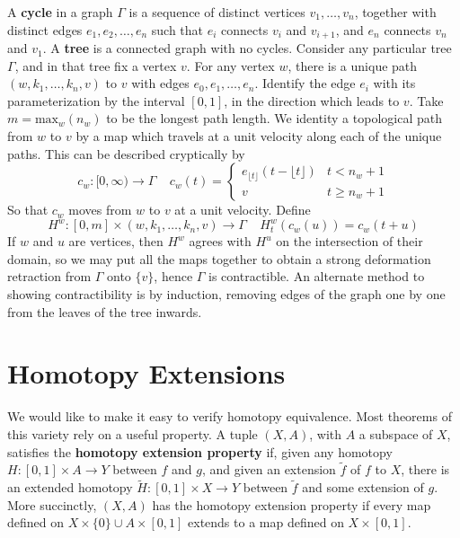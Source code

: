 \begin{example}
    A {\bf cycle} in a graph $\Gamma$ is a sequence of distinct vertices $v_1, \dots, v_n$, together with distinct edges $e_1, e_2, \dots, e_n$ such that $e_i$ connects $v_i$ and $v_{i+1}$, and $e_n$ connects $v_n$ and $v_1$. A {\bf tree} is a connected graph with no cycles. Consider any particular tree $\Gamma$, and in that tree fix a vertex $v$. For any vertex $w$, there is a unique path $(w, k_1, \dots, k_n, v)$ to $v$ with edges $e_0, e_1, \dots, e_n$. Identify the edge $e_i$ with its parameterization by the interval $[0,1]$, in the direction which leads to $v$. Take $m = \text{max}_w(n_w)$ to be the longest path length. We identity a topological path from $w$ to $v$ by a map which travels at a unit velocity along each of the unique paths. This can be described cryptically by
    \[ c_w:[0,\infty) \to \Gamma\ \ \ \ \ c_w(t) = \begin{cases} e_{\lfloor t \rfloor}(t - \lfloor t \rfloor) & t < n_w + 1 \\ v & t \geq n_w + 1 \end{cases} \]
    So that $c_w$ moves from $w$ to $v$ at a unit velocity. Define
    \[ H^w: [0,m] \times (w, k_1, \dots, k_n, v) \to \Gamma\ \ \ \ \ H^w_t(c_w(u)) = c_w(t + u) \]
    If $w$ and $u$ are vertices, then $H^w$ agrees with $H^u$ on the intersection of their domain, so we may put all the maps together to obtain a strong deformation retraction from $\Gamma$ onto $\{ v \}$, hence $\Gamma$ is contractible. An alternate method to showing contractibility is by induction, removing edges of the graph one by one from the leaves of the tree inwards.
\end{example}


\section{Homotopy Extensions}

We would like to make it easy to verify homotopy equivalence. Most theorems of this variety rely on a useful property. A tuple $(X,A)$, with $A$ a subspace of $X$, satisfies the {\bf homotopy extension property} if, given any homotopy $H: [0,1] \times A \to Y$ between $f$ and $g$, and given an extension $\tilde{f}$ of $f$ to $X$, there is an extended homotopy $\widetilde{H}: [0,1] \times X \to Y$ between $\tilde{f}$ and some extension of $g$. More succinctly, $(X,A)$ has the homotopy extension property if every map defined on $X \times \{ 0 \} \cup A \times [0,1]$ extends to a map defined on $X \times [0,1]$.

